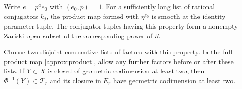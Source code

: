 \begin{lemma}\label{approx:two-lists}
Write $e=p^a e_0$ with $(e_0,p)=1$.  For a sufficiently long
list of rational conjugators $k_j$, the product map formed with
$\eta^{e_0}$ is smooth at the identity parameter tuple.
The conjugator tuples having this property form a nonempty
Zariski open subset of the corresponding power of $S$.

Choose two disjoint consecutive lists of factors with this
property.  In the full product map \eqref{approx:product}, allow
any further factors before or after these lists.  If
$Y\subset X$ is closed of geometric codimension at least two,
then $\Phi^{-1}(Y)\subset\mathcal T_r$ and its closure in $E_r$
have geometric codimension at least two.
\end{lemma}

